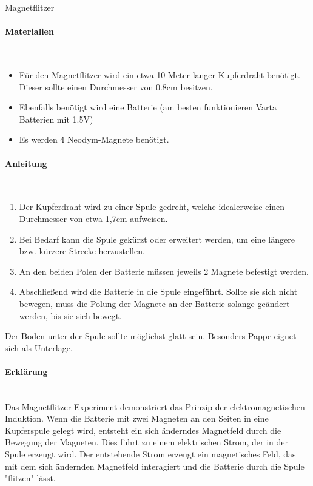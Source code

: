 \documentclass[a4paper, 12pt]{report}
\begin{document}
	\thispagestyle{empty}
	
	{
		\centering
		\Huge
		\color{blue}
		Magnetflitzer
	}
	
	\centering
	\raggedright
	\paragraph{\color{blue}Materialien} \mbox{} \\
	\begin{itemize}
		\item Für den Magnetflitzer wird ein etwa 10 Meter langer Kupferdraht benötigt.
		Dieser sollte einen Durchmesser von 0.8cm besitzen.
		\item Ebenfalls benötigt wird eine Batterie (am besten funktionieren Varta Batterien mit 1.5V)
		\item Es werden 4 Neodym-Magnete benötigt. 
	\end{itemize}
	\paragraph{\color{blue}Anleitung} \mbox{} \\
	\begin{enumerate}
		\item Der Kupferdraht wird zu einer Spule gedreht, welche idealerweise einen Durchmesser von etwa 1,7cm aufweisen.
		\item Bei Bedarf kann die Spule gekürzt oder erweitert werden, um eine längere bzw. kürzere Strecke herzustellen.
		\item An den beiden Polen der Batterie müssen jeweils 2 Magnete befestigt werden.
		\item Abschließend wird die Batterie in die Spule eingeführt. Sollte sie sich nicht bewegen, muss die Polung der Magnete an der Batterie solange geändert werden, bis sie sich bewegt.
	\end{enumerate}
	Der Boden unter der Spule sollte möglichst glatt sein. 
	Besonders Pappe eignet sich als Unterlage.
	\paragraph{\color{blue}Erklärung} \mbox{} \\
	Das \dq Magnetflitzer\dq-Experiment demonstriert das Prinzip der elektromagnetischen Induktion.
	Wenn die Batterie mit zwei Magneten an den Seiten in eine Kupferspule gelegt wird, entsteht ein sich änderndes Magnetfeld durch die Bewegung der Magneten.
	Dies führt zu einem elektrischen Strom, der in der Spule erzeugt wird.
	Der entstehende Strom erzeugt ein magnetisches Feld, das mit dem sich ändernden Magnetfeld interagiert und die Batterie durch die Spule "flitzen" lässt.
\end{document}

